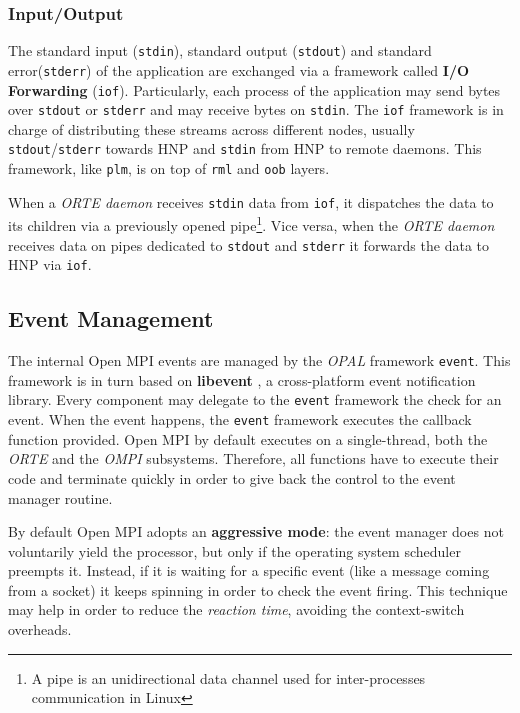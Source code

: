 \subsubsection{Input/Output}
The standard input (\texttt{stdin}), standard output (\texttt{stdout}) and
standard error\linebreak (\texttt{stderr}) of the application are
exchanged via a framework called \textbf{I/O Forwarding} (\texttt{iof}).
Particularly, each process of the application may send bytes over \texttt{stdout}
or \texttt{stderr} and may receive bytes on \texttt{stdin}. The
\texttt{iof} framework is in charge of distributing these streams across different
nodes, usually \texttt{stdout}/\texttt{stderr} towards HNP and \texttt{stdin} 
from HNP to remote daemons. This framework, like \texttt{plm}, is on top of
\texttt{rml} and \texttt{oob} layers.

When a \emph{ORTE daemon} receives \texttt{stdin} data from \texttt{iof}, it dispatches
the data to its children via a previously opened pipe\footnote{A pipe is an
unidirectional data channel used for inter-processes communication in Linux}. Vice
versa, when the \emph{ORTE daemon} receives data on pipes dedicated to \texttt{stdout}
and \texttt{stderr} it forwards the data to HNP via \texttt{iof}.

\subsection{Event Management}
The internal Open MPI events are managed by the \emph{OPAL} framework
\texttt{event}. This framework is in turn based on \textbf{libevent}
\cite{provos2003libevent}, a cross-platform event notification library.
Every component may delegate to the \texttt{event} framework the check for an
event. When the event happens, the \texttt{event} framework executes the
callback function provided.
Open MPI by default executes on a single-thread, both the \emph{ORTE} and the
\emph{OMPI} subsystems. Therefore, all functions have to execute their code and
terminate quickly in order to give back the control to the event manager
routine.

By default Open MPI adopts an \textbf{aggressive mode}: the event manager does
not voluntarily yield the processor, but only if the operating system scheduler
preempts it. Instead, if it is waiting for a specific event (like a message
coming from a socket) it keeps spinning in order to check the event firing. This
technique may help in order to reduce the \emph{reaction time}, avoiding the
context-switch overheads.

